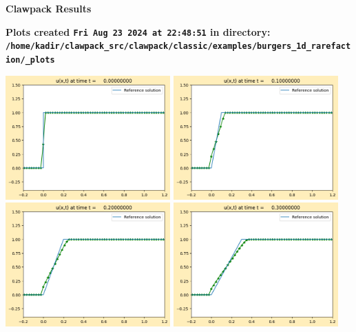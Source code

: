 \documentclass[11pt]{article}
\begin{document}
        \begin{center}{\Large\bf Clawpack Results}\vskip 5pt
        
        \bf Plots created {\tt Fri Aug 23 2024 at 22:48:51} in directory: \vskip 5pt
        \verb+/home/kadir/clawpack_src/clawpack/classic/examples/burgers_1d_rarefaction/_plots+
        \end{center}
        \vskip 5pt
        \includegraphics[width=0.475\textwidth]{frame0000fig0.png}
\vskip 10pt 
\includegraphics[width=0.475\textwidth]{frame0001fig0.png}
\vskip 10pt 
\includegraphics[width=0.475\textwidth]{frame0002fig0.png}
\vskip 10pt 
\includegraphics[width=0.475\textwidth]{frame0003fig0.png}
\end{document}
